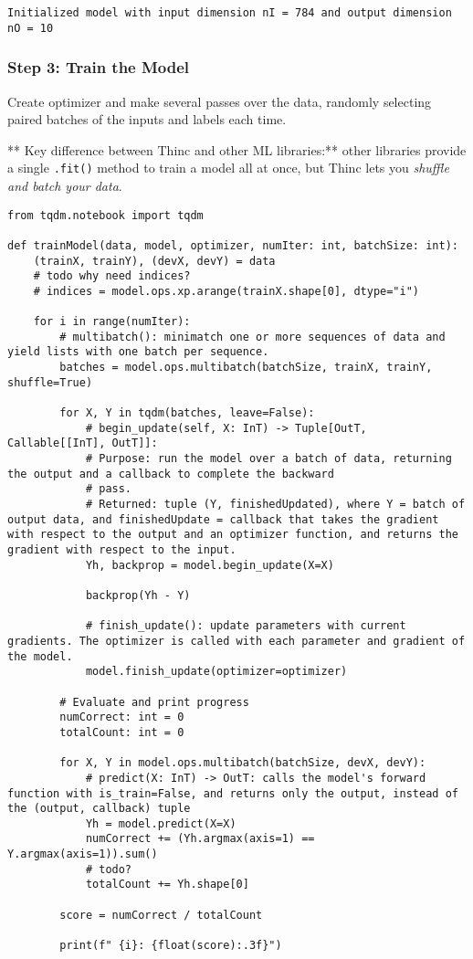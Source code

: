 \documentclass[
]{article}
\begin{document}
\begin{verbatim}
Initialized model with input dimension nI = 784 and output dimension nO = 10
\end{verbatim}

\hypertarget{step-3-train-the-model}{%
\subsubsection{Step 3: Train the Model}\label{step-3-train-the-model}}

Create optimizer and make several passes over the data, randomly
selecting paired batches of the inputs and labels each time.

** Key difference between Thinc and other ML libraries:** other
libraries provide a single \texttt{.fit()} method to train
a model all at once, but Thinc lets you \emph{shuffle and batch your
data}.

\begin{verbatim}
from tqdm.notebook import tqdm

def trainModel(data, model, optimizer, numIter: int, batchSize: int):
    (trainX, trainY), (devX, devY) = data
    # todo why need indices?
    # indices = model.ops.xp.arange(trainX.shape[0], dtype="i")

    for i in range(numIter):
        # multibatch(): minimatch one or more sequences of data and yield lists with one batch per sequence.
        batches = model.ops.multibatch(batchSize, trainX, trainY, shuffle=True)

        for X, Y in tqdm(batches, leave=False):
            # begin_update(self, X: InT) -> Tuple[OutT, Callable[[InT], OutT]]:
            # Purpose: run the model over a batch of data, returning the output and a callback to complete the backward
            # pass.
            # Returned: tuple (Y, finishedUpdated), where Y = batch of output data, and finishedUpdate = callback that takes the gradient with respect to the output and an optimizer function, and returns the gradient with respect to the input.
            Yh, backprop = model.begin_update(X=X)

            backprop(Yh - Y)

            # finish_update(): update parameters with current gradients. The optimizer is called with each parameter and gradient of the model.
            model.finish_update(optimizer=optimizer)

        # Evaluate and print progress
        numCorrect: int = 0
        totalCount: int = 0

        for X, Y in model.ops.multibatch(batchSize, devX, devY):
            # predict(X: InT) -> OutT: calls the model's forward function with is_train=False, and returns only the output, instead of the (output, callback) tuple
            Yh = model.predict(X=X)
            numCorrect += (Yh.argmax(axis=1) == Y.argmax(axis=1)).sum()
            # todo?
            totalCount += Yh.shape[0]

        score = numCorrect / totalCount

        print(f" {i}: {float(score):.3f}")
\end{verbatim}
\end{document}

